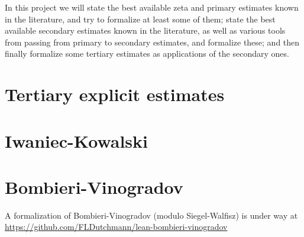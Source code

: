 In this project we will state the best available zeta and primary estimates known in the literature, and try
to formalize at least some of them; state the best available secondary estimates known in the
literature, as well as various tools from passing from primary to secondary estimates, and
formalize these; and then finally formalize some tertiary estimates as applications of the
secondary ones.



\chapter{Tertiary explicit estimates}\label{tertiary-chapter}




\chapter{Iwaniec-Kowalski}\label{IK-chapter}


\chapter{Bombieri-Vinogradov}\label{BV-chapter}

A formalization of Bombieri-Vinogradov (modulo Siegel-Walfisz) is under way at \url{https://github.com/FLDutchmann/lean-bombieri-vinogradov}




